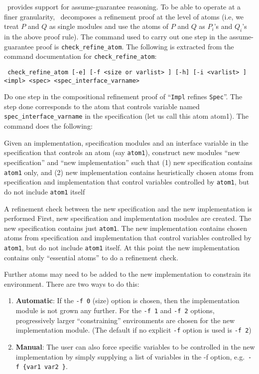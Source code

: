 \mypar
\noindent
\mocha\ provides support for assume-guarantee reasoning. 
To be able to operate at a finer granularity,
\mocha\ decomposes a refinement proof at the
level of atoms (i.e, we treat $P$ and $Q$ as single modules and use
the atoms of $P$ and $Q$ as $P_i$'s and $Q_i$'s in the above proof
rule). The command used to carry out one step in the assume-guarantee
proof is {\tt check\_refine\_atom}.
The following is extracted from the command documentation for 
{\tt check\_refine\_atom}:

\mypar
{\tt
  check\_refine\_atom [-e] [-f <size or varlist> ] [-h] [-i <varlist> ]\ \\
  \qu [-k] [-o <fname>] [-r] [-v] <impl> <spec> <spec\_interface\_varname> 
}


\mypar
Do one step in the compositional refinement proof of ``{\tt Impl} refines
{\tt Spec}''. The step done corresponds to the atom that controls variable
named {\tt spec\_interface\_varname} in the specification (let us call this atom
atom1). The command does the following:   

\mypar
Given an implementation, specification modules and an interface variable
in the specification that controls an atom (say {\tt atom1}), construct new modules
``new specification'' and ``new implementation'' such that
(1) new specification contains {\tt atom1} only, and
(2) new implementation contains heuristically chosen
atoms from specification and implementation that control variables controlled
by {\tt atom1}, but do not include {\tt atom1} itself

\mypar
A refinement check between the new specification and the new
implementation is performed First, new specification and implementation
modules are created. The new specification contains just {\tt atom1}. The new
implementation contains chosen atoms from specification and implementation
that control variables controlled by {\tt atom1}, but do not include {\tt atom1} itself. At
this point the new implementation contains only ``essential atoms'' to do a
refinement check. 

\mypar
Further atoms may need to be added to the new implementation to constrain
its environment. There are two ways to do this:
\begin {enumerate}
\item
{\bf Automatic}: If the {\tt -f 0} (size) option is chosen, then the implementation
module is not grown any further. For the {\tt -f 1} and {\tt -f 2} options,
progressively larger ``constraining'' environments are chosen for the new
implementation module. (The default if no explicit {\tt -f} option is used is 
{\tt -f 2}) 
\item
{\bf Manual}: The user can also force specific variables to be controlled in
the new implementation by simply supplying a list of variables in the -f
option, e.g.~{\tt  -f \{var1 var2 \}}.
\end {enumerate}

